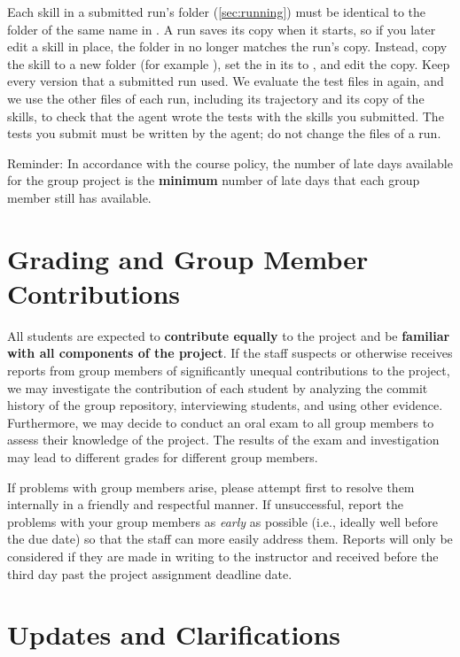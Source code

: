 \documentclass[letterpaper,11pt]{article}
\begin{document}
\medskip
Each skill in a submitted run's  folder (\autoref{sec:running})
must be identical to the folder of the same name in . A run saves its copy when it starts, so if you later edit a skill in place, the
folder in  no longer matches the run's copy. Instead, copy the skill to a new folder (for example
), set the  in its  to , and edit the copy. Keep
every version that a submitted run used. We evaluate the test files in  again, and we use the other
files of each run, including its trajectory and its copy of the skills, to
check that the agent wrote the tests with the skills you submitted. The tests you submit must be written by the agent; do not change the files of a run.

Reminder: In accordance with the course policy, the number of late days
available for the group project is the \textbf{minimum} number of late days that
each group member still has available.

\section{Grading and Group Member Contributions}
\label{sec:grading}

All students are expected to \textbf{contribute equally} to the project and be \textbf{familiar
with all components of the project}. If the staff suspects or otherwise receives
reports from group members of significantly unequal contributions to the project,
we may investigate the contribution of each student by analyzing the commit
history of the group repository, interviewing students, and using other evidence.
Furthermore, we may decide to conduct an oral exam to all group members to
assess their knowledge of the project. The results of the exam and investigation
may lead to different grades for different group members.

If problems with group members arise, please attempt first to resolve them
internally in a friendly and respectful manner. If unsuccessful, report the
problems with your group members as \textit{early} as possible (i.e., ideally
well before the due date) so that the staff can more easily address them.
Reports will only be considered if they are made in writing to the instructor
and received before the third day past the project assignment deadline date.

\section{Updates and Clarifications}
\label{sec:updates}
\end{document}
